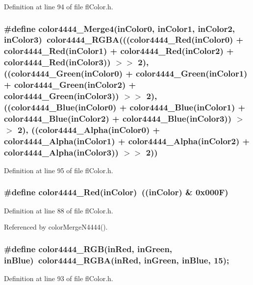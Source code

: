 Definition at line 94 of file fl\-Color.h.
\subsubsection{\setlength{\rightskip}{0pt plus 5cm}\#define color4444\_\-Merge4(in\-Color0, in\-Color1, in\-Color2, in\-Color3)~color4444\_\-RGBA(((color4444\_\-Red(in\-Color0) + color4444\_\-Red(in\-Color1) + color4444\_\-Red(in\-Color2) + color4444\_\-Red(in\-Color3)) $>$$>$ 2), ((color4444\_\-Green(in\-Color0) + color4444\_\-Green(in\-Color1) + color4444\_\-Green(in\-Color2) + color4444\_\-Green(in\-Color3)) $>$$>$ 2), ((color4444\_\-Blue(in\-Color0) + color4444\_\-Blue(in\-Color1) + color4444\_\-Blue(in\-Color2) + color4444\_\-Blue(in\-Color3)) $>$$>$ 2), ((color4444\_\-Alpha(in\-Color0) + color4444\_\-Alpha(in\-Color1) + color4444\_\-Alpha(in\-Color2) + color4444\_\-Alpha(in\-Color3)) $>$$>$ 2))}\label{flColor_8h_b1b360b073ab6144855ffd5908435e7e}




Definition at line 95 of file fl\-Color.h.
\subsubsection{\setlength{\rightskip}{0pt plus 5cm}\#define color4444\_\-Red(in\-Color)~((in\-Color) \& 0x000F)}\label{flColor_8h_0e508e63d5a89cef0587fbc10ab4e7cb}




Definition at line 88 of file fl\-Color.h.

Referenced by color\-Merge\-N4444().
\subsubsection{\setlength{\rightskip}{0pt plus 5cm}\#define color4444\_\-RGB(in\-Red, in\-Green, in\-Blue)~color4444\_\-RGBA(in\-Red, in\-Green, in\-Blue, 15);}\label{flColor_8h_a56630f8a65825e0c2e1b03e0908bff3}




Definition at line 93 of file fl\-Color.h.

